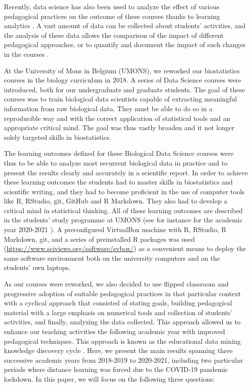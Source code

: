 \documentclass{aims} %
\theoremstyle{definition}
\begin{document}
Recently, data science has also been used to analyze the effect of
various pedagogical practices on the outcome of these courses thanks to
learning analytics \cite{Estrellado2020}. A vast amount of data can be
collected about students' activities, and the analysis of these data
allows the comparison of the impact of different pedagogical approaches,
or to quantify and document the impact of such changes in the courses
\cite{Romero2020}.

At the University of Mons in Belgium (UMONS), we reworked our
biostatistics courses in the biology curriculum in 2018. A series of
Data Science courses were introduced, both for our undergraduate and
graduate students. The goal of these courses was to train biological
data scientists capable of extracting meaningful information from raw
biological data. They must be able to do so in a reproducible way and
with the correct application of statistical tools and an appropriate
critical mind. The goal was thus vastly broaden and it not longer solely
targeted skills in biostatistics.

The learning outcomes defined for these Biological Data Science courses
were thus to be able to analyze most recurrent biological data in
practice and to present the results clearly and accurately in a
scientific report. In order to achieve these learning outcomes the
students had to master skills in biostatistics and scientific writing,
and they had to become proficient in the use of computer tools like R,
RStudio, git, GitHub and R Markdown. They also had to develop a critical
mind in statistical thinking. All of these learning outcomes are
described in the students' study programme at UMONS (see for instance
for the academic year 2020-2021
\cite{ds1bio2021, ds2bio2021, ds3bio2021}). A preconfigured VirtualBox
machine with R, RStudio, R Markdown, git, and a series of preinstalled R
packages was used (\url{https://www.sciviews.org/software/svbox/}) as a
convenient means to deploy the same software environment both on the
university computers and on the students' own laptops.

As our courses were reworked, we also decided to use flipped classroom
and progressive adoption of suitable pedagogical practices in that
particular context with a cyclical approach that consisted of stating
goals, building pedagogical material with a large emphasis on numerical
tools and collection of students' activities, and finally, analyzing the
data collected. This approach allowed us to enhance our teaching
activities the following academic year with improved pedagogical
techniques. This approach is known as the educational data mining
knowledge discovery cycle \cite{Romero2020}. Here, we present the main
results spanning three successive academic years from 2018-2019 to
2020-2021, including two particular periods where distance learning was
forced due to the COVID-19 pandemic lockdown. In this paper, we will
focus on the following three questions:
\end{document}
